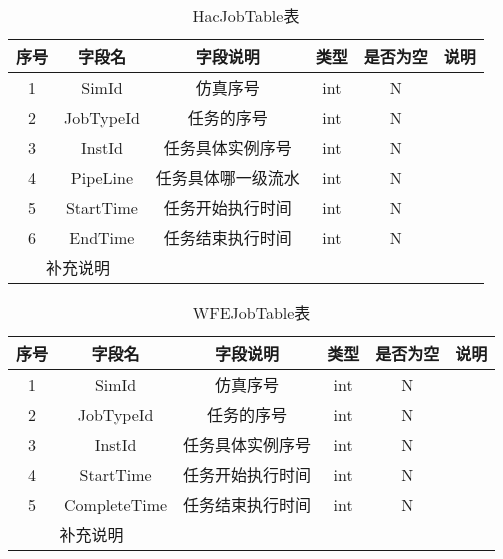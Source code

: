 \begin{table}[!h]
    \centering\normalsize
    \caption{HacJobTable表}
    \begin{tabular}{|c|c|c|c|c|c|}
    \hline
    \textbf{序号} & \textbf{字段名} & \textbf{字段说明} & \textbf{类型} & \textbf{是否为空} & \textbf{说明} \\ \hline
    1           & SimId        & 仿真序号          & int         & N             &             \\ \hline
    2           & JobTypeId    & 任务的序号         & int         & N             &             \\ \hline
    3           & InstId       & 任务具体实例序号      & int         & N             &             \\ \hline
    4           & PipeLine     & 任务具体哪一级流水     & int         & N             &             \\ \hline
    5           & StartTime    & 任务开始执行时间      & int         & N             &             \\ \hline
    6           & EndTime      & 任务结束执行时间      & int         & N             &             \\ \hline
    \multicolumn{2}{|c|}{补充说明} &               &             &               &             \\ \hline
    \end{tabular}
    \end{table}

\begin{table}[!h]
    \centering\normalsize
    \caption{WFEJobTable表}
    \begin{tabular}{|c|c|c|c|c|c|}
    \hline
    \textbf{序号} & \textbf{字段名} & \textbf{字段说明} & \textbf{类型} & \textbf{是否为空} & \textbf{说明} \\ \hline
    1           & SimId        & 仿真序号          & int         & N             &             \\ \hline
    2           & JobTypeId    & 任务的序号         & int         & N             &             \\ \hline
    3           & InstId       & 任务具体实例序号      & int         & N             &             \\ \hline
    4           & StartTime    & 任务开始执行时间      & int         & N             &             \\ \hline
    5           & CompleteTime & 任务结束执行时间      & int         & N             &             \\ \hline
    \multicolumn{2}{|c|}{补充说明} &               &             &               &             \\ \hline
    \end{tabular}
    \end{table}

